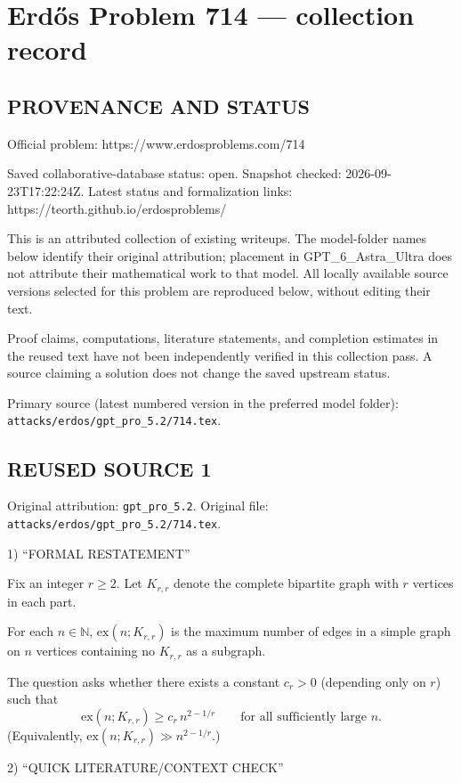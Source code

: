 \section*{Erd\H{o}s Problem 714 --- collection record}

\subsection*{PROVENANCE AND STATUS}
Official problem: https://www.erdosproblems.com/714

Saved collaborative-database status: open.
Snapshot checked: 2026-09-23T17:22:24Z.
Latest status and formalization links: https://teorth.github.io/erdosproblems/

This is an attributed collection of existing writeups. The model-folder names below identify their original attribution; placement in GPT\_6\_Astra\_Ultra does not attribute their mathematical work to that model. All locally available source versions selected for this problem are reproduced below, without editing their text.

Proof claims, computations, literature statements, and completion estimates in the reused text have not been independently verified in this collection pass. A source claiming a solution does not change the saved upstream status.

Primary source (latest numbered version in the preferred model folder): \texttt{attacks/erdos/gpt\_pro\_5.2/714.tex}.

\subsection*{REUSED SOURCE 1}
Original attribution: \texttt{gpt\_pro\_5.2}.
Original file: \texttt{attacks/erdos/gpt\_pro\_5.2/714.tex}.


1) “FORMAL RESTATEMENT”

Fix an integer $r\ge 2$. Let $K_{r,r}$ denote the complete bipartite graph with $r$ vertices in each part.

For each $n\in\mathbb N$, $\mathrm{ex}(n;K_{r,r})$ is the maximum number of edges in a simple graph on $n$ vertices containing no $K_{r,r}$ as a subgraph.

The question asks whether there exists a constant $c_r>0$ (depending only on $r$) such that
\[
\mathrm{ex}(n;K_{r,r}) \ge c_r\, n^{2-1/r}
\qquad\text{for all sufficiently large }n.
\]
(Equivalently, $\mathrm{ex}(n;K_{r,r})\gg n^{2-1/r}$.)

2) “QUICK LITERATURE/CONTEXT CHECK”

